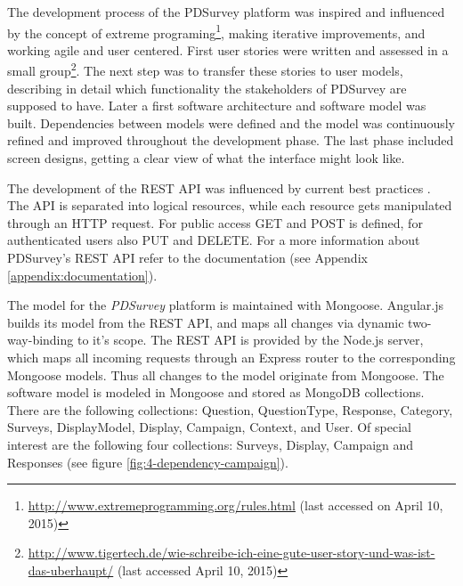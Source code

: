 	The development process of the PDSurvey platform was inspired and influenced by the concept of extreme programing\footnote{\url{http://www.extremeprogramming.org/rules.html} (last accessed on April 10, 2015)}, making iterative improvements, and working agile and user centered. First user stories were written and assessed in a small group\footnote{\url{http://www.tigertech.de/wie-schreibe-ich-eine-gute-user-story-und-was-ist-das-uberhaupt/} (last accessed April 10, 2015)}. The next step was to transfer these stories to user models, describing in detail which functionality the stakeholders of PDSurvey are supposed to have. Later a first software architecture and software model was built. Dependencies between models were defined and the model was continuously refined and improved throughout the development phase. The last phase included screen designs, getting a clear view of what the interface might look like.


	The development of the REST API was influenced by current best practices \cite{Sahni2015RESTAPI, TutsPlus2015RESTAPI, hughes2012einfuhrung}. The API is separated into logical resources, while each resource gets manipulated through an HTTP request. For public access GET and POST is defined, for authenticated users also PUT and DELETE. For a more information about PDSurvey's REST API refer to the documentation (see Appendix \ref{appendix:documentation}).


	The model for the \textit{PDSurvey} platform is maintained with Mongoose. Angular.js builds its model from the REST API, and maps all changes via dynamic two-way-binding to it's scope. The REST API is provided by the Node.js server, which maps all incoming requests through an Express router to the corresponding Mongoose models. Thus all changes to the model originate from Mongoose.
	The software model is modeled in Mongoose and stored as MongoDB collections. There are the following collections: Question, QuestionType, Response, Category, Surveys, DisplayModel, Display, Campaign, Context, and User. 
	Of special interest are the following four collections: Surveys, Display, Campaign and Responses (see figure \ref{fig:4-dependency-campaign}).

